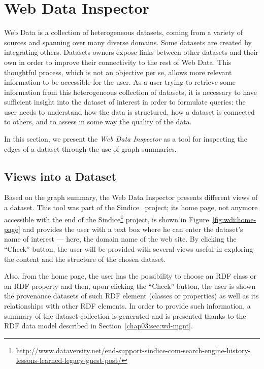 \section{Web Data Inspector}
\label{sec:web-data-inspector}

Web Data is a collection of heterogeneous datasets, coming from a variety of sources and spanning over many diverse domains. Some datasets are created by integrating others. Datasets owners  expose links between other datasets and their own in order to improve their connectivity to the rest of Web Data. This thoughtful process, which is not an objective per se, allows more relevant information to be accessible for the user. As a user trying to retrieve some information from this heterogeneous collection of datasets, it is necessary to have sufficient insight into the dataset of interest in order to formulate queries: the user needs to understand how the data is structured, how a dataset is connected to others, and to assess in some way the quality of the data.

In this section, we present the \emph{Web Data Inspector} as a tool for inspecting the edges of a dataset through the use of graph summaries.

\subsection{Views into a Dataset}

Based on the graph summary, the Web Data Inspector presents different views of a dataset. This tool was part of the Sindice~\cite{oren:2008:sdl} project; its home page, not anymore accessible with the end of the Sindice\footnote{\url{http://www.dataversity.net/end-support-sindice-com-search-engine-history-lessons-learned-legacy-guest-post/}} project, is shown in Figure~\ref{fig:wdi:home-page} and provides the user with a text box where he can enter the dataset's name of interest --- here, the domain name of the web site. By clicking the ``Check'' button, the user will be provided with several views useful in exploring the content and the structure of the chosen dataset.

Also, from the home page, the user has the possibility to choose an RDF class or an RDF property and then, upon clicking the ``Check'' button, the user is shown the provenance datasets of such RDF element (classes or properties) as well as its relationships with other RDF elements. In order to provide such information, a summary of the dataset collection is generated and is presented thanks to the RDF data model described in Section~\ref{chap03:sec:wd-mgnt}.

